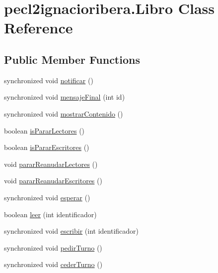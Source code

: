 \hypertarget{classpecl2ignacioribera_1_1_libro}{}\section{pecl2ignacioribera.\+Libro Class Reference}
\label{classpecl2ignacioribera_1_1_libro}
\subsection*{Public Member Functions}
\begin{DoxyCompactItemize}
\item 
synchronized void \mbox{\hyperlink{classpecl2ignacioribera_1_1_libro_a44cfbf7f47ada045300c48a3712aa804}{notificar}} ()
\item 
synchronized void \mbox{\hyperlink{classpecl2ignacioribera_1_1_libro_a76e984080b5b46f17b7f7c7a1d880779}{mensaje\+Final}} (int id)
\item 
synchronized void \mbox{\hyperlink{classpecl2ignacioribera_1_1_libro_abe0c6068a2acc893bca1caff4c6bf424}{mostrar\+Contenido}} ()
\item 
boolean \mbox{\hyperlink{classpecl2ignacioribera_1_1_libro_a5d5ef2c83d96944b1d043e9fb5378edd}{is\+Parar\+Lectores}} ()
\item 
boolean \mbox{\hyperlink{classpecl2ignacioribera_1_1_libro_aabc572905978f8f3e19dd6533084149a}{is\+Parar\+Escritores}} ()
\item 
void \mbox{\hyperlink{classpecl2ignacioribera_1_1_libro_aec141b6a8787d8af7f1596a42283d378}{parar\+Reanudar\+Lectores}} ()
\item 
void \mbox{\hyperlink{classpecl2ignacioribera_1_1_libro_aa841d46804bc4a70f1f1fc5300257380}{parar\+Reanudar\+Escritores}} ()
\item 
synchronized void \mbox{\hyperlink{classpecl2ignacioribera_1_1_libro_a4c83b4f2726cfe98dcac1feb72e39b02}{esperar}} ()
\item 
boolean \mbox{\hyperlink{classpecl2ignacioribera_1_1_libro_ae907d7ff683317468cf2772211b5289c}{leer}} (int identificador)
\item 
synchronized void \mbox{\hyperlink{classpecl2ignacioribera_1_1_libro_ac19867792e66d8a51752c91888b25e07}{escribir}} (int identificador)
\item 
synchronized void \mbox{\hyperlink{classpecl2ignacioribera_1_1_libro_aa68bbbcfa16984a13f848e8a2038c97a}{pedir\+Turno}} ()
\item 
synchronized void \mbox{\hyperlink{classpecl2ignacioribera_1_1_libro_a78cc01e6cefa7dc833706d59550a4624}{ceder\+Turno}} ()

\end{DoxyCompactItemize}
